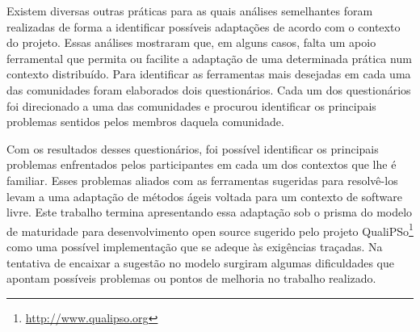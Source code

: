 \documentclass[12pt]{article}
\begin{document}
Existem diversas outras práticas para as quais análises semelhantes
foram realizadas de forma a identificar possíveis adaptações de acordo
com o contexto do projeto. Essas análises mostraram que, em alguns
casos, falta um apoio ferramental que permita ou facilite a adaptação
de uma determinada prática num contexto distribuído. Para identificar
as ferramentas mais desejadas em cada uma das comunidades foram
elaborados dois questionários. Cada um dos questionários foi
direcionado a uma das comunidades e procurou identificar os principais
problemas sentidos pelos membros daquela comunidade.

Com os resultados desses questionários, foi possível identificar os
principais problemas enfrentados pelos participantes em cada um dos
contextos que lhe é familiar. Esses problemas aliados com as
ferramentas sugeridas para resolvê-los levam a uma adaptação de
métodos ágeis voltada para um contexto de software livre. Este
trabalho termina apresentando essa adaptação sob o prisma do modelo de
maturidade para desenvolvimento open source sugerido pelo projeto
QualiPSo\footnote{\href{http://www.qualipso.org}{http://www.qualipso.org}}
como uma possível implementação que se adeque às exigências
traçadas. Na tentativa de encaixar a sugestão no modelo surgiram
algumas dificuldades que apontam possíveis problemas ou pontos de
melhoria no trabalho realizado.
\end{document}
